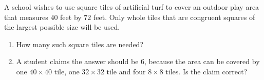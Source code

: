 A school wishes to use square tiles of artificial turf to cover an outdoor play area that measures $40$ feet by $72$ feet. Only whole tiles that are congruent squares of the largest possible size will be used.
\begin{enumerate}
\item[(a)] How many such square tiles are needed?
\item[(b)] A student claims the answer should be $6$, because the area can be covered by one $40\times40$ tile, one $32\times32$ tile and four $8\times8$ tiles. Is the claim correct?
\end{enumerate}
